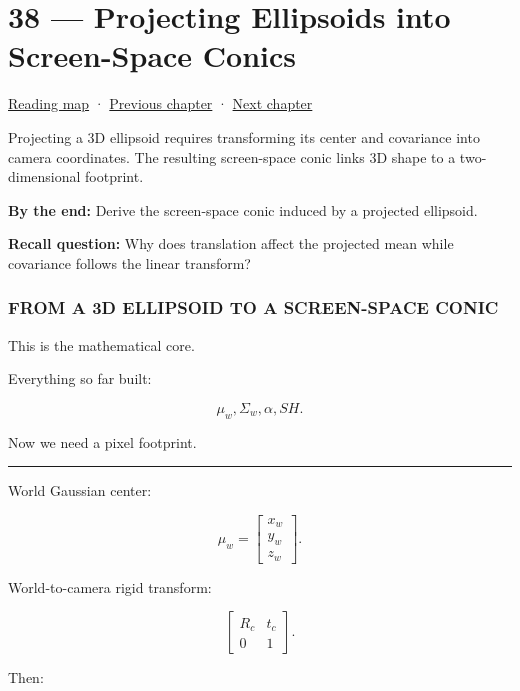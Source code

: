 \hypertarget{04-visual-computing-ii-ch038}{}
\chapter{38 --- Projecting Ellipsoids into Screen-Space Conics}\label{04-visual-computing-ii-ch038-projecting-ellipsoids-into-screen-space-conics}

\hyperref[volume-reading-map]{Reading map} · \hyperref[04-visual-computing-ii-ch037-gaussian-splatting-and-editable-captured-worlds]{Previous chapter} · \hyperref[04-visual-computing-ii-ch039-tiling-ordering-and-compositing-at-scale]{Next chapter}

Projecting a 3D ellipsoid requires transforming its center and covariance into camera coordinates. The resulting screen-space conic links 3D shape to a two-dimensional footprint.

\textbf{By the end:} Derive the screen-space conic induced by a projected ellipsoid.

\textbf{Recall question:} Why does translation affect the projected mean while covariance follows the linear transform?

\subsection{FROM A 3D ELLIPSOID TO A SCREEN-SPACE CONIC}\label{04-visual-computing-ii-ch038-from-a-3d-ellipsoid-to-a-screen-space-conic}

This is the mathematical core.

Everything so far built:

\[
\mu_w,
\Sigma_w,
\alpha,
SH.
\]

Now we need a pixel footprint.

\begin{center}\rule{0.5\linewidth}{0.5pt}\end{center}

World Gaussian center:

\[
\mu_w=
\begin{bmatrix}
x_w\\y_w\\z_w
\end{bmatrix}.
\]

World-to-camera rigid transform:

\[
\begin{bmatrix}
R_c&t_c\\
0&1
\end{bmatrix}.
\]

Then:

